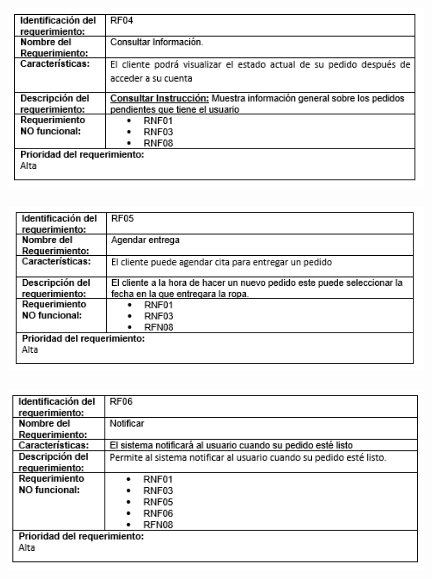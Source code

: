 \newpage



\begin{figure}[htb]
\begin{center}
\includegraphics[width=11cm]{./imagenes/tablas/RF04.png}
\end{center}

\end{figure}



\begin{figure}[htb]
\begin{center}
\includegraphics[width=11cm]{./imagenes/tablas/RF05.png}
\end{center}

\end{figure}




\begin{figure}[htb]
\begin{center}
\includegraphics[width=11cm]{./imagenes/tablas/RF06.png}
\end{center}

\end{figure}

